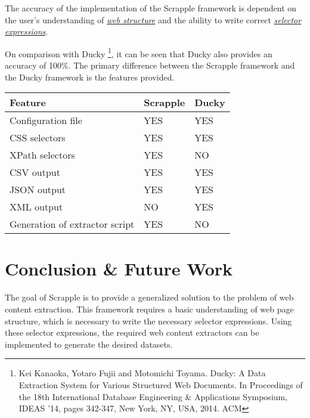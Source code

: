 \documentclass[letterpaper,12pt,english]{sphinxmanual}
\begin{document}
The accuracy of the implementation of the Scrapple framework is dependent on the user's understanding of {\hyperref[concepts/structure:concepts-structure]{\emph{web structure}}} and the ability to write correct {\hyperref[concepts/selectors:concepts-selectors]{\emph{selector expressions}}}.

On comparison with Ducky \footnote{
Kei Kanaoka, Yotaro Fujii and Motomichi Toyama. Ducky: A Data Extraction System for Various Structured Web Documents. In Proceedings of the 18th International Database Engineering \& Applications Symposium, IDEAS ’14, pages 342-347, New York, NY, USA, 2014. ACM
}, it can be seen that Ducky also provides an accuracy of 100\%. The primary difference between the Scrapple framework and the Ducky framework is the features provided.

\begin{tabulary}{\linewidth}{|L|L|L|}
\hline
\textsf{\relax 
Feature
} & \textsf{\relax 
Scrapple
} & \textsf{\relax 
Ducky
}\\
\hline
Configuration file
 & 
YES
 & 
YES
\\

CSS selectors
 & 
YES
 & 
YES
\\

XPath selectors
 & 
YES
 & 
NO
\\

CSV output
 & 
YES
 & 
YES
\\

JSON output
 & 
YES
 & 
YES
\\

XML output
 & 
NO
 & 
YES
\\

Generation of extractor script
 & 
YES
 & 
NO
\\
\hline\end{tabulary}



\chapter{Conclusion \& Future Work}
\label{index:conclusion-future-work}
The goal of Scrapple is to provide a generalized solution to the problem of web content extraction. This framework requires a basic understanding of web page structure, which is necessary to write the necessary selector expressions. Using these selector expressions, the required web content extractors can be implemented to generate the desired datasets.
\end{document}
